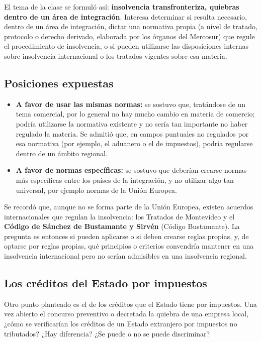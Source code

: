 \documentclass[12pt,oneside]{book}
\begin{document}
El tema de la clase se formuló así: \textbf{insolvencia transfronteriza, quiebras dentro de un área de integración}. Interesa determinar si resulta necesario, dentro de un área de integración, dictar una normativa propia (a nivel de tratado, protocolo o derecho derivado, elaborada por los órganos del Mercosur) que regule el procedimiento de insolvencia, o si pueden utilizarse las disposiciones internas sobre insolvencia internacional o los tratados vigentes sobre esa materia.

\subsection{Posiciones expuestas}

\begin{itemize}
    \item \textbf{A favor de usar las mismas normas:} se sostuvo que, tratándose de un tema comercial, por lo general no hay mucho cambio en materia de comercio; podría utilizarse la normativa existente y no sería tan importante no haber regulado la materia. Se admitió que, en campos puntuales no regulados por esa normativa (por ejemplo, el aduanero o el de impuestos), podría regularse dentro de un ámbito regional.
    \item \textbf{A favor de normas específicas:} se sostuvo que deberían crearse normas más específicas entre los países de la integración, y no utilizar algo tan universal, por ejemplo normas de la Unión Europea.
\end{itemize}

Se recordó que, aunque no se forma parte de la Unión Europea, existen acuerdos internacionales que regulan la insolvencia: los Tratados de Montevideo y el \textbf{Código de Sánchez de Bustamante y Sirvén} (Código Bustamante). La pregunta es entonces si pueden aplicarse o si deben crearse reglas propias, y, de optarse por reglas propias, qué principios o criterios convendría mantener en una insolvencia internacional pero no serían admisibles en una insolvencia regional.

\subsection{Los créditos del Estado por impuestos}

Otro punto planteado es el de los créditos que el Estado tiene por impuestos. Una vez abierto el concurso preventivo o decretada la quiebra de una empresa local, ¿cómo se verificarían los créditos de un Estado extranjero por impuestos no tributados? ¿Hay diferencia? ¿Se puede o no se puede discriminar?
\end{document}
